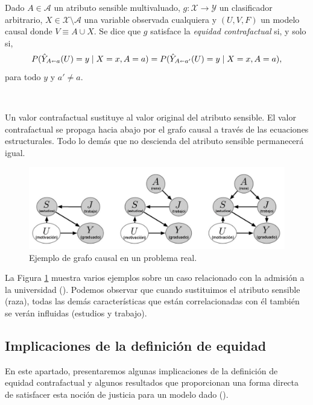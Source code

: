 \documentclass[oneside,openright,titlepage,numbers=noenddot,openany,headinclude,footinclude=true,
cleardoublepage=empty,abstractoff,BCOR=5mm,paper=a4,fontsize=12pt,main=spanish]{scrreprt}
\begin{document}
\begin{definition}
Dado $A\in \mathcal{A}$ un atributo sensible multivaluado, $g\colon \mathcal{X} \to \mathcal{Y}$ un clasificador arbitrario, $X \in \mathcal{X}\setminus \mathcal{A}$ una variable observada cualquiera y $(U,V,F)$ un modelo causal donde $V \equiv A \cup X$. Se dice que $g$ satisface la \textit{equidad contrafactual} si, y solo si, $$P(\hat{Y}_{A\shortleftarrow a}(U)=y \mid X=x, A=a)=P(\hat{Y}_{A\shortleftarrow a'}(U)=y \mid X=x, A=a),$$
para todo $y$ y $a'\neq a$. 
\end{definition}\

Un valor contrafactual sustituye al valor original del atributo sensible. El valor contrafactual se propaga hacia abajo por el grafo causal a través de las ecuaciones estructurales. Todo lo demás que no descienda del atributo sensible permanecerá igual.\\

\begin{figure}[h]
	\centering
	\includegraphics[width=15.4cm]{grafo_causal.png}
	\caption{Ejemplo de grafo causal en un problema real.}
    \label{fig:caugraph}
\end{figure}

La Figura \ref{fig:caugraph} muestra varios ejemplos sobre un caso relacionado con la admisión a la universidad (\cite{worlds2017}). Podemos observar que cuando sustituimos el atributo sensible (raza), todas las demás características que están correlacionadas con él también se verán influidas (estudios y trabajo).

\subsection{Implicaciones de la definición de equidad}

En este apartado, presentaremos algunas implicaciones de la definición de equidad contrafactual y algunos resultados que proporcionan una forma directa de satisfacer esta noción de justicia para un modelo dado (\cite{counterfactual2018}).\\
\end{document}
